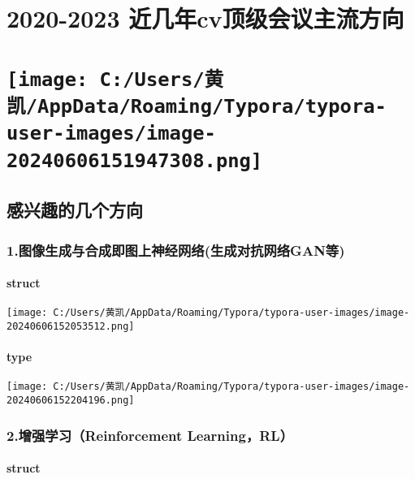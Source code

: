 \documentclass[
]{article}
\author{}
\date{}
\begin{document}
\section{2020-2023
近几年cv顶级会议主流方向}\label{2020-2023-ux8fd1ux51e0ux5e74cvux9876ux7ea7ux4f1aux8baeux4e3bux6d41ux65b9ux5411}

\section{\texorpdfstring{\protect\texttt{[image: C:/Users/黄凯/AppData/Roaming/Typora/typora-user-images/image-20240606151947308.png]}}{}}

\subsection{感兴趣的几个方向}\label{ux611fux5174ux8da3ux7684ux51e0ux4e2aux65b9ux5411}

\subsubsection{1.图像生成与合成即图上神经网络(生成对抗网络GAN等)}\label{1ux56feux50cfux751fux6210ux4e0eux5408ux6210ux5373ux56feux4e0aux795eux7ecfux7f51ux7edcux751fux6210ux5bf9ux6297ux7f51ux7edcganux7b49}

\paragraph{struct}\label{struct-1}

\texttt{[image: C:/Users/黄凯/AppData/Roaming/Typora/typora-user-images/image-20240606152053512.png]}

\paragraph{type}\label{type-1}

\texttt{[image: C:/Users/黄凯/AppData/Roaming/Typora/typora-user-images/image-20240606152204196.png]}

\subsubsection{2.增强学习（Reinforcement
Learning，RL）}\label{2ux589eux5f3aux5b66ux4e60reinforcement-learningrluxff09}

\paragraph{struct}\label{struct-2}
\end{document}
